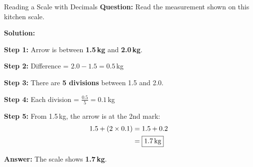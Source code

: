 \documentclass[12pt,a4paper]{article}
\begin{document}
\begin{examplebox}{Reading a Scale with Decimals}
\textbf{Question:} Read the measurement shown on this kitchen scale.

\begin{center}
\end{center}

\textbf{Solution:}

\textbf{Step 1:} Arrow is between \textbf{1.5\,kg} and \textbf{2.0\,kg}.

\textbf{Step 2:} Difference = $2.0 - 1.5 = 0.5$\,kg

\textbf{Step 3:} There are \textbf{5 divisions} between 1.5 and 2.0.

\textbf{Step 4:} Each division = $\frac{0.5}{5} = 0.1$\,kg

\textbf{Step 5:} From 1.5\,kg, the arrow is at the 2nd mark:
\begin{align*}
1.5 + (2 \times 0.1) &= 1.5 + 0.2 \\
&= \boxed{1.7\text{\,kg}}
\end{align*}

\textbf{Answer:} The scale shows \textbf{1.7\,kg}.
\end{examplebox}
\end{document}
